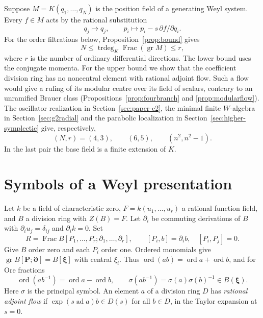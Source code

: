 \documentclass[11pt,a4paper]{article}
\renewcommand{\le}{\leqslant}\renewcommand{\ge}{\geqslant}
\newcommand{\Frac}{\operatorname{Frac}}
\newcommand{\ad}{\operatorname{ad}}
\newcommand{\trdeg}{\operatorname{trdeg}}
\newcommand{\gr}{\operatorname{gr}}
\theoremstyle{definition}
\begin{document}
Suppose \(M=K(q_1,\ldots,q_N)\) is the position field of a generating Weyl system. Every \(f\in M\) acts by the rational substitution
\[
   q_j\mapsto q_j,\qquad p_i\mapsto p_i-s\,\partial f/\partial q_i.
\]
For the order filtrations below, Proposition~\ref{prop:bound} gives
\[
 N\le\trdeg_K\Frac(\gr M)\le r,
\]
where \(r\) is the number of ordinary differential directions. The lower bound uses the conjugate momenta. For the upper bound we show that the coefficient division ring has no noncentral element with rational adjoint flow. Such a flow would give a ruling of its modular centre over its field of scalars, contrary to an unramified Brauer class (Propositions~\ref{prop:fourbranch} and \ref{prop:modularflow}).
The oscillator realization in Section~\ref{sec:paper-c2}, the minimal finite \(W\)-algebra in Section~\ref{sec:g2radial} and the parabolic localization in Section~\ref{sec:higher-symplectic} give, respectively,
\[
 (N,r)=(4,3),\qquad (6,5),\qquad (n^2,n^2-1).
\]
In the last pair the base field is a finite extension of \(K\).

\section{Symbols of a Weyl presentation}\label{sec:symbol}
Let \(k\) be a field of characteristic zero, \(F=k(u_1,\ldots,u_r)\) a rational function field, and \(B\) a division ring with \(Z(B)=F\). Let \(\partial_i\) be commuting derivations of \(B\) with \(\partial_i u_j=\delta_{ij}\) and \(\partial_i k=0\). Set
\[
 R=\Frac B[P_1,\ldots,P_r;\partial_1,\ldots,\partial_r],
 \qquad [P_i,b]=\partial_i b,\quad [P_i,P_j]=0.
\]
Give \(B\) order zero and each \(P_i\) order one. Ordered monomials give \(\gr B[\mathbf P;\boldsymbol\partial]=B[\boldsymbol\xi]\) with central \(\xi_i\). Thus \(\operatorname{ord}(ab)=\operatorname{ord}a+\operatorname{ord}b\), and for Ore fractions
\[
 \operatorname{ord}(ab^{-1})=\operatorname{ord}a-\operatorname{ord}b,\qquad
 \sigma(ab^{-1})=\sigma(a)\sigma(b)^{-1}\in B(\boldsymbol\xi).
\]
Here \(\sigma\) is the principal symbol. An element \(a\) of a division ring \(D\) has \emph{rational adjoint flow} if \(\exp(s\ad a)b\in D(s)\) for all \(b\in D\), in the Taylor expansion at \(s=0\).
\end{document}
